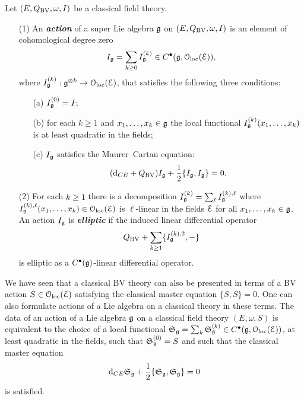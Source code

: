 \documentclass[10pt, oneside]{article}
\newcommand{\defterm}[1]{\textbf{\emph{#1}}}
\begin{document}
\begin{definition}
\label{infinitesimal_action_def}
Let $(E, Q_{\mathrm{BV}},\omega, I)$ be a classical field theory. 
\begin{itemize}
\item[(1)]
An \defterm{action} of a super Lie algebra $\mathfrak g$ on $(E, Q_{\mathrm{BV}}, \omega, I)$ is an element of cohomological degree zero 
\[I_\mathfrak g = \sum_{k\geq 0} I_{\mathfrak g}^{(k)} \in C^\bullet(\mathfrak g, \mathcal{O}_{\rm loc}(\mathcal E)),\]
where $I_\mathfrak g^{(k)} : \mathfrak g^{\otimes k} \to \mathcal{O}_{\rm loc}(\mathcal E)$, that satisfies the following three conditions:
\begin{itemize}
\item[(a)] $I_\mathfrak g^{(0)} = I$;
\item[(b)] for each $k \geq 1$ and $x_1, \ldots, x_k \in \mathfrak g$ the local functional $I^{(k)}_\mathfrak g (x_1,\ldots, x_k)$ is at least quadratic in the fields;
\item[(c)] $I_\mathfrak g$ satisfies the Maurer--Cartan equation:
\[({\rm d}_{CE} + Q_{\mathrm{BV}}) I_\mathfrak g + \frac{1}{2} \{I_\mathfrak g, I_\mathfrak g\} = 0.\]
\end{itemize}
\item[(2)]
For each $k \geq 1$ there is a decomposition $I_\mathfrak g^{(k)} = \sum_{\ell} I_\mathfrak g^{(k),\ell}$ where $ I_\mathfrak g^{(k),\ell}(x_1,\ldots,x_k) \in \mathcal{O}_{\rm loc}(\mathcal E)$ is $\ell$-linear in the fields $\mathcal E$ for all $x_1,\ldots,x_k \in \mathfrak g$.
An action $I_\mathfrak g$ is \defterm{elliptic} if the induced linear differential operator
\[
Q_{\mathrm{BV}} + \sum_{k \geq 1} \{I_\mathfrak g^{(k),2}, -\}
\]
is elliptic as a $C^\bullet(\mathfrak g)$-linear differential operator.
\end{itemize}
\end{definition}

\begin{rmk}
\end{rmk}

\begin{rmk}
We have seen that a classical BV theory can also be presented in terms of a BV action $S \in \mathcal{O}_{\rm loc}(\mathcal E)$ satisfying the classical master equation $\{S, S\} = 0$. 
One can also formulate actions of a Lie algebra on a classical theory in these terms. 
The data of an action of a Lie algebra $\mathfrak g$ on a classical field theory $(E, \omega, S)$ is equivalent to the choice of a local functional $\mathfrak S_\mathfrak g = \sum_k \mathfrak S_\mathfrak g^{(k)}\in C^\bullet(\mathfrak g, \mathcal{O}_{\rm loc}(\mathcal E))$, at least quadratic in the fields, such that $\mathfrak S^{(0)}_\mathfrak g = S$ and such that the classical master equation
\[
{\rm d}_{CE} \mathfrak S_\mathfrak g + \frac{1}{2} \{\mathfrak S_\mathfrak g, \mathfrak S_\mathfrak g\} = 0 
\]
is satisfied.
\end{rmk}
\end{document}
